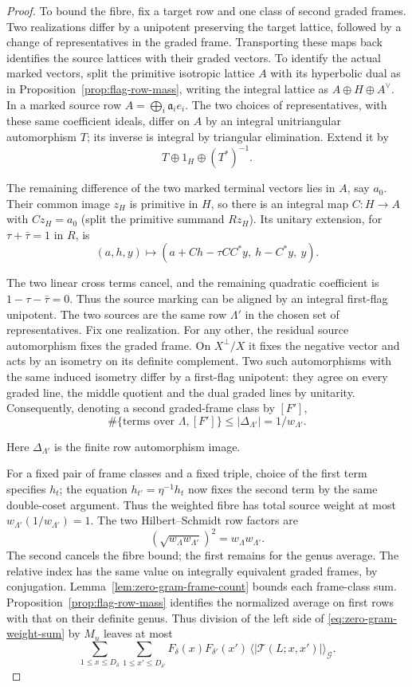 \begin{proof}
To bound the fibre, fix a target row and one class of second
graded frames. Two realizations differ by a unipotent preserving
the target lattice, followed by a change of representatives in the
graded frame. Transporting these maps back identifies the source
lattices with their graded vectors. To identify the actual marked
vectors, split the primitive isotropic lattice \(A\) with its
hyperbolic dual as in Proposition~\ref{prop:flag-row-mass}, writing
the integral lattice as \(A\oplus H\oplus A^\vee\). In a marked
source row \(A=\bigoplus_i\mathfrak a_i e_i\). The two choices
of representatives, with these same coefficient ideals, differ on
\(A\) by an integral unitriangular automorphism \(T\); its inverse
is integral by triangular elimination. Extend it by
\[
            T\oplus 1_H\oplus (T^*)^{-1}.
\]

The remaining difference of the two marked terminal vectors lies
in \(A\), say \(a_0\). Their common image \(z_H\) is primitive
in \(H\), so there is an integral map \(C:H\to A\) with
\(Cz_H=a_0\) (split the primitive summand \(Rz_H\)). Its unitary
extension, for \(\tau+\bar\tau=1\) in \(R\), is
\[
 (a,h,y)\longmapsto
 (a+Ch-\tau CC^*y,\ h-C^*y,\ y).
\]

The two linear cross terms cancel, and the remaining quadratic
coefficient is \(1-\tau-\bar\tau=0\). Thus the source marking
can be aligned by an integral first-flag unipotent.
The two sources are the same row \(\Lambda'\) in the chosen set
of representatives. Fix one realization. For any
other, the residual source automorphism fixes the graded frame.
On \(X^\perp/X\) it fixes the negative vector and acts by an
isometry on its definite complement. Two such automorphisms with the
same induced isometry differ by a first-flag unipotent: they agree
on every graded line, the middle quotient and the dual graded lines
by unitarity. Consequently, denoting a second graded-frame class by \([F']\),
\[
 \#\{\text{terms over }\Lambda,[F']\}
        \le|\Delta_{\Lambda'}|=1/w_{\Lambda'} .
\]

Here \(\Delta_{\Lambda'}\) is the finite row automorphism image.

For a fixed pair of frame classes and a fixed triple, choice of
the first term specifies \(h_t\); the equation
\(h_{t'}=\eta^{-1}h_t\) now fixes the second term by the same
double-coset argument. Thus the weighted fibre has total source
weight at most \(w_{\Lambda'}(1/w_{\Lambda'})=1\).
The two Hilbert--Schmidt row factors are
\[
  (\sqrt{w_\Lambda w_{\Lambda'}})^2=w_\Lambda w_{\Lambda'} .
\]
The second cancels the fibre bound; the first remains for the
genus average. The relative index has the same value on
integrally equivalent graded frames, by conjugation.
Lemma~\ref{lem:zero-gram-frame-count} bounds each frame-class
sum. Proposition~\ref{prop:flag-row-mass} identifies the
normalized average on first rows with that on their definite genus.
Thus division of the left side of \eqref{eq:zero-gram-weight-sum}
by \(M_u\) leaves at most
\[
 \sum_{1\le x\le D_\delta}\sum_{1\le x'\le D_{\delta'}}
  F_\delta(x)F_{\delta'}(x')\,
         \langle|\mathcal T(L;x,x')|\rangle_{\mathcal G}.
\]


\end{proof}
